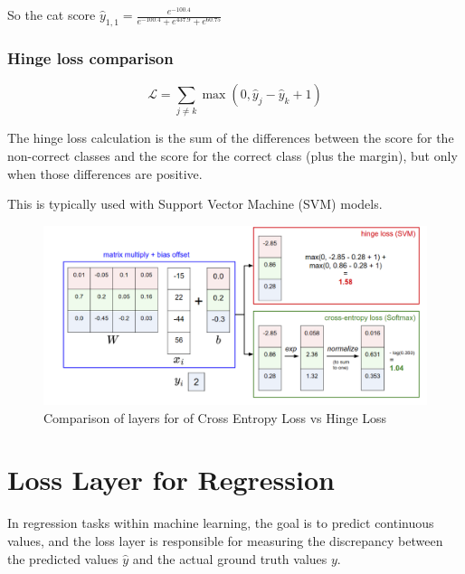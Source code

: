 So the cat score \(\hat{y}_{1,1}=\frac{e^{-100.4}}{e^{-100.4}+e^{437.9}+e^{60.75}}\)

\subsubsection*{Hinge loss comparison}

\[\mathcal{L}=\sum_{j\neq k}\max(0,\hat{y}_j-\hat{y}_k+1)\]

The hinge loss calculation is the sum of the differences between the score for the non-correct classes and the score for the correct class (plus the margin), but only when those differences are positive.

This is typically used with Support Vector Machine (SVM) models.



\begin{figure}[H]
    \centering
    \includegraphics[width=1\linewidth]{img/hinge_softmax.png}
    \caption{Comparison of layers for of Cross Entropy Loss vs Hinge Loss}
    \label{fig:enter-label}
\end{figure}

\section{Loss Layer for Regression}

In regression tasks within machine learning, the goal is to predict continuous values, and the loss layer is responsible for measuring the discrepancy between the predicted values \( \hat{y} \) and the actual ground truth values \( y \).

